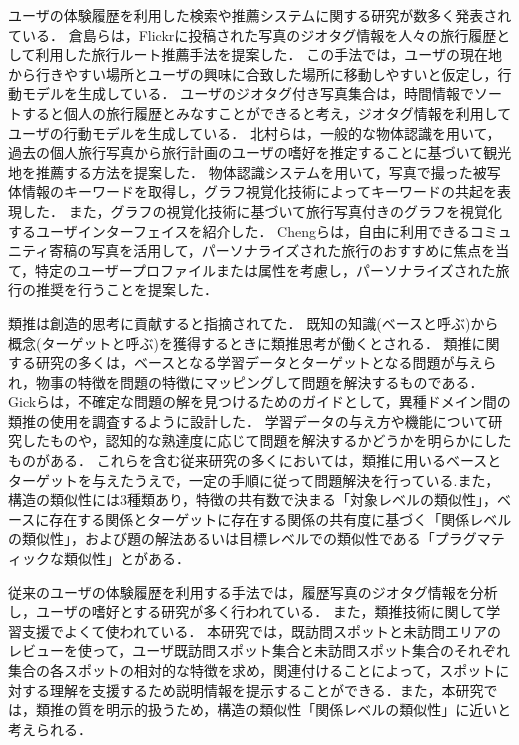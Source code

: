 \documentclass{deimj}
\begin{document}
ユーザの体験履歴を利用した検索や推薦システムに関する研究が数多く発表されている．
倉島ら\cite{Codd07}は，Flickrに投稿された写真のジオタグ情報を人々の旅行履歴として利用した旅行ルート推薦手法を提案した．
この手法では，ユーザの現在地から行きやすい場所とユーザの興味に合致した場所に移動しやすいと仮定し，行動モデルを生成している．
ユーザのジオタグ付き写真集合は，時間情報でソートすると個人の旅行履歴とみなすことができると考え，ジオタグ情報を利用してユーザの行動モデルを生成している．
北村らは\cite{Codd08}，一般的な物体認識を用いて，過去の個人旅行写真から旅行計画のユーザの嗜好を推定することに基づいて観光地を推薦する方法を提案した．
物体認識システムを用いて，写真で撮った被写体情報のキーワードを取得し，グラフ視覚化技術によってキーワードの共起を表現した．
また，グラフの視覚化技術に基づいて旅行写真付きのグラフを視覚化するユーザインターフェイスを紹介した．
Chengらは\cite{Codd09}，自由に利用できるコミュニティ寄稿の写真を活用して，パーソナライズされた旅行のおすすめに焦点を当て，特定のユーザープロファイルまたは属性を考慮し，パーソナライズされた旅行の推奨を行うことを提案した．

類推は創造的思考に貢献すると指摘されてた\cite{Codd01}．
既知の知識(ベースと呼ぶ)から概念(ターゲットと呼ぶ)を獲得するときに類推思考が働くとされる\cite{Codd02}．
類推に関する研究の多くは，ベースとなる学習データとターゲットとなる問題が与えられ，物事の特徴を問題の特徴にマッピングして問題を解決するもの\cite{Codd03}である．
Gickらは，不確定な問題の解を見つけるためのガイドとして，異種ドメイン間の類推の使用を調査するように設計した．
学習データの与え方や機能について研究したもの\cite{Codd04}や，認知的な熟達度に応じて問題を解決するかどうかを明らかにしたもの\cite{Codd05}がある．
これらを含む従来研究の多くにおいては，類推に用いるベースとターゲットを与えたうえで，一定の手順に従って問題解決を行っている.また，構造の類似性には3種類あり，特徴の共有数で決まる「対象レベルの類似性」，ベースに存在する関係とターゲットに存在する関係の共有度に基づく「関係レベルの類似性」，および題の解法あるいは目標レベルでの類似性である「プラグマティックな類似性」とがある．

従来のユーザの体験履歴を利用する手法では，履歴写真のジオタグ情報を分析し，ユーザの嗜好とする研究が多く行われている．
また，類推技術に関して学習支援でよくて使われている．
本研究では，既訪問スポットと未訪問エリアのレビューを使って，ユーザ既訪問スポット集合と未訪問スポット集合のそれぞれ集合の各スポットの相対的な特徴を求め，関連付けることによって，スポットに対する理解を支援するため説明情報を提示することができる．また，本研究では，類推の質を明示的扱うため，構造の類似性「関係レベルの類似性」に近いと考えられる．
\end{document}
